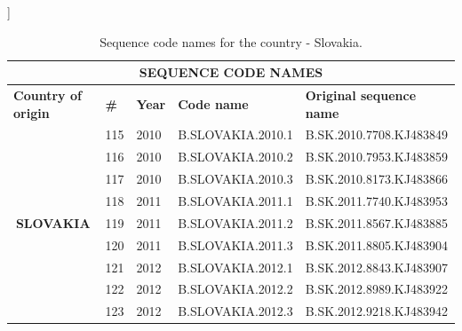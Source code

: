 \begin{table}[htbp]
    \caption{Sequence code names for the country - Slovakia.}
    \centering]
\begin{tabular}{|cllll|}
\hline
\multicolumn{5}{|c|}{\textbf{SEQUENCE   CODE NAMES}}                                                                                                                                                         \\ \hline
\multicolumn{1}{|l|}{\textbf{Country   of origin}}       & \multicolumn{1}{l|}{\textbf{\#}} & \multicolumn{1}{r|}{\textbf{Year}} & \multicolumn{1}{l|}{\textbf{Code name}} & \textbf{Original sequence name} \\ \hline
\multicolumn{1}{|c|}{\multirow{9}{*}{\textbf{SLOVAKIA}}} & \multicolumn{1}{l|}{115}         & \multicolumn{1}{l|}{2010}          & \multicolumn{1}{l|}{B.SLOVAKIA.2010.1}  & B.SK.2010.7708.KJ483849         \\ \cline{2-5} 
\multicolumn{1}{|c|}{}                                   & \multicolumn{1}{l|}{116}         & \multicolumn{1}{l|}{2010}          & \multicolumn{1}{l|}{B.SLOVAKIA.2010.2}  & B.SK.2010.7953.KJ483859         \\ \cline{2-5} 
\multicolumn{1}{|c|}{}                                   & \multicolumn{1}{l|}{117}         & \multicolumn{1}{l|}{2010}          & \multicolumn{1}{l|}{B.SLOVAKIA.2010.3}  & B.SK.2010.8173.KJ483866         \\ \cline{2-5} 
\multicolumn{1}{|c|}{}                                   & \multicolumn{1}{l|}{118}         & \multicolumn{1}{l|}{2011}          & \multicolumn{1}{l|}{B.SLOVAKIA.2011.1}  & B.SK.2011.7740.KJ483953         \\ \cline{2-5} 
\multicolumn{1}{|c|}{}                                   & \multicolumn{1}{l|}{119}         & \multicolumn{1}{l|}{2011}          & \multicolumn{1}{l|}{B.SLOVAKIA.2011.2}  & B.SK.2011.8567.KJ483885         \\ \cline{2-5} 
\multicolumn{1}{|c|}{}                                   & \multicolumn{1}{l|}{120}         & \multicolumn{1}{l|}{2011}          & \multicolumn{1}{l|}{B.SLOVAKIA.2011.3}  & B.SK.2011.8805.KJ483904         \\ \cline{2-5} 
\multicolumn{1}{|c|}{}                                   & \multicolumn{1}{l|}{121}         & \multicolumn{1}{l|}{2012}          & \multicolumn{1}{l|}{B.SLOVAKIA.2012.1}  & B.SK.2012.8843.KJ483907         \\ \cline{2-5} 
\multicolumn{1}{|c|}{}                                   & \multicolumn{1}{l|}{122}         & \multicolumn{1}{l|}{2012}          & \multicolumn{1}{l|}{B.SLOVAKIA.2012.2}  & B.SK.2012.8989.KJ483922         \\ \cline{2-5} 
\multicolumn{1}{|c|}{}                                   & \multicolumn{1}{l|}{123}         & \multicolumn{1}{l|}{2012}          & \multicolumn{1}{l|}{B.SLOVAKIA.2012.3}  & B.SK.2012.9218.KJ483942         \\ \hline
\end{tabular}
\end{table}

